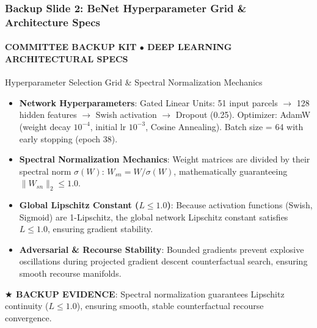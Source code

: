 \documentclass[aspectratio=169, 10pt]{beamer}
\newcommand{\leadbullet}[2]{\textbf{\color{NavyDark}#1}: \color{TextBody}#2}
\begin{document}
\begin{frame}
  \frametitle{Backup Slide 2: BeNet Hyperparameter Grid \& Architecture Specs}
  \framesubtitle{COMMITTEE BACKUP KIT $\bullet$ DEEP LEARNING ARCHITECTURAL SPECS}

  \begin{defensecard}{Hyperparameter Selection Grid \& Spectral Normalization Mechanics}
    \begin{itemize}\setlength{\itemsep}{2.5pt}\setlength{\parskip}{0pt}\fontsize{8.2pt}{10.2pt}\selectfont
      \item \leadbullet{Network Hyperparameters}{Gated Linear Units: 51 input parcels $\to$ 128 hidden features $\to$ Swish activation $\to$ Dropout (0.25). Optimizer: AdamW (weight decay $10^{-4}$, initial lr $10^{-3}$, Cosine Annealing). Batch size = 64 with early stopping (epoch 38).}
      \item \leadbullet{Spectral Normalization Mechanics}{Weight matrices are divided by their spectral norm $\sigma(W)$: $W_{sn} = W / \sigma(W)$, mathematically guaranteeing $\|W_{sn}\|_2 \le 1.0$.}
      \item \leadbullet{Global Lipschitz Constant ($L \le 1.0$)}{Because activation functions (Swish, Sigmoid) are 1-Lipschitz, the global network Lipschitz constant satisfies $L \le 1.0$, ensuring gradient stability.}
      \item \leadbullet{Adversarial \& Recourse Stability}{Bounded gradients prevent explosive oscillations during projected gradient descent counterfactual search, ensuring smooth recourse manifolds.}
    \end{itemize}
  \end{defensecard}
  \vspace{-0.1cm}

  \begin{takeawaybanner}
    \textbf{\color{GoldPill}$\bigstar$ BACKUP EVIDENCE}: Spectral normalization guarantees Lipschitz continuity ($L \le 1.0$), ensuring smooth, stable counterfactual recourse convergence.
  \end{takeawaybanner}
\end{frame}
\end{document}
